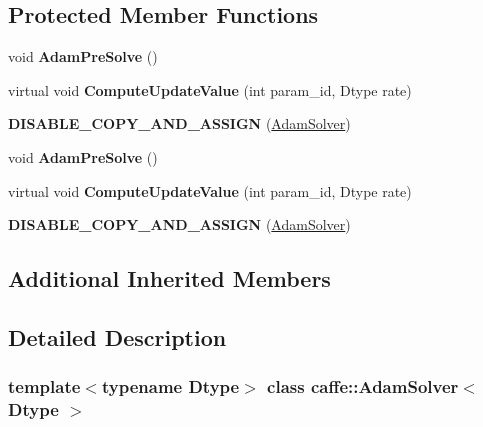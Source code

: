 \subsection*{Protected Member Functions}
\begin{DoxyCompactItemize}
\item 
\mbox{\label{classcaffe_1_1_adam_solver_a72bbfc1fb2ec2194b183fa65f77ef1fb}} 
void {\bfseries Adam\+Pre\+Solve} ()
\item 
\mbox{\label{classcaffe_1_1_adam_solver_a11f2c48ead67c91ba9e871acdbda1af8}} 
virtual void {\bfseries Compute\+Update\+Value} (int param\+\_\+id, Dtype rate)
\item 
\mbox{\label{classcaffe_1_1_adam_solver_a5f192e195185ab841f083415333f5147}} 
{\bfseries D\+I\+S\+A\+B\+L\+E\+\_\+\+C\+O\+P\+Y\+\_\+\+A\+N\+D\+\_\+\+A\+S\+S\+I\+GN} (\mbox{\hyperlink{classcaffe_1_1_adam_solver}{Adam\+Solver}})
\item 
\mbox{\label{classcaffe_1_1_adam_solver_a72bbfc1fb2ec2194b183fa65f77ef1fb}} 
void {\bfseries Adam\+Pre\+Solve} ()
\item 
\mbox{\label{classcaffe_1_1_adam_solver_ab502b325cb0d36f48c19c7b97268ca1a}} 
virtual void {\bfseries Compute\+Update\+Value} (int param\+\_\+id, Dtype rate)
\item 
\mbox{\label{classcaffe_1_1_adam_solver_a5f192e195185ab841f083415333f5147}} 
{\bfseries D\+I\+S\+A\+B\+L\+E\+\_\+\+C\+O\+P\+Y\+\_\+\+A\+N\+D\+\_\+\+A\+S\+S\+I\+GN} (\mbox{\hyperlink{classcaffe_1_1_adam_solver}{Adam\+Solver}})
\end{DoxyCompactItemize}
\subsection*{Additional Inherited Members}


\subsection{Detailed Description}
\subsubsection*{template$<$typename Dtype$>$\newline
class caffe\+::\+Adam\+Solver$<$ Dtype $>$}

